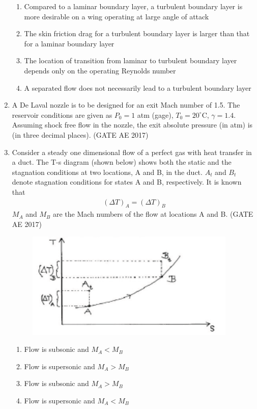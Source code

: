 \documentclass[journal,12pt,onecolumn]{IEEEtran}
\theoremstyle{remark}
\begin{document}
\begin{flushleft}
\begin{enumerate}
\begin{enumerate}
\item Compared to a laminar boundary layer, a turbulent boundary layer is more desirable on a wing operating at large angle of attack
\item The skin friction drag for a turbulent boundary layer is larger than that for a laminar boundary layer
\item The location of transition from laminar to turbulent boundary layer depends only on the operating Reynolds number
\item A separated flow does not necessarily lead to a turbulent boundary layer
\end{enumerate}

\item
A De Laval nozzle is to be designed for an exit Mach number of 1.5. The reservoir conditions are given as $P_0=1$ atm (gage), $T_0=20^\circ$C, $\gamma=1.4$. Assuming shock free flow in the nozzle, the exit absolute pressure (in atm) is \underline{\hspace{2cm}} (in three decimal places).  
\hfill (GATE AE 2017)
\item Consider a steady one dimensional flow of a perfect gas with heat transfer in a duct. The T-s diagram (shown below) shows both the static and the stagnation conditions at two locations, A and B, in the duct. $A_t$ and $B_t$ denote stagnation conditions for states A and B, respectively. It is known that 
\begin{align*}
(\Delta T)_A = (\Delta T)_B
\end{align*}
$M_A$ and $M_B$ are the Mach numbers of the flow at locations A and B. \hfill (GATE AE 2017)
\begin{figure}[H]
    \centering
    \includegraphics[width=0.5\columnwidth]{figs/9.png}
    \caption{}
    \label{fig:placeholder}
\end{figure}
\begin{enumerate}
\item Flow is subsonic and $M_A < M_B$
\item Flow is supersonic and $M_A > M_B$
\item Flow is subsonic and $M_A > M_B$
\item Flow is supersonic and $M_A < M_B$
\end{enumerate}



\end{enumerate}
\end{flushleft}
\end{document}
